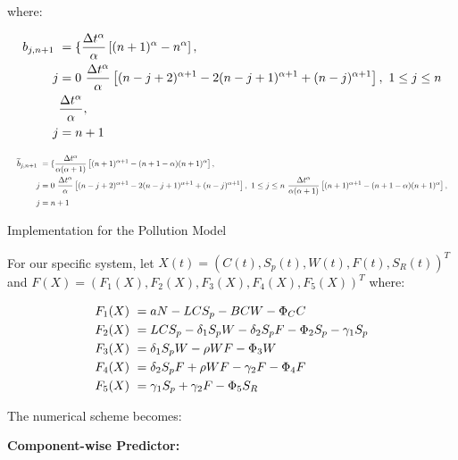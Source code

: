 \documentclass[10pt]{NSP1}
\newcommand{\fitwidth}[1]{\resizebox{\ifdim\width>\linewidth\linewidth\else\width\fi}{!}{#1}}
\begin{document}
where:

\[
\fitwidth{$\displaystyle \begin{aligned}
b_{j,n + 1}\ &= \{\frac{\Delta t^{\alpha}}{\alpha}\left\lbrack (n + 1)^{\alpha} - n^{\alpha} \right\rbrack, \\
j &= 0\ \frac{\Delta t^{\alpha}}{\alpha}\left\lbrack (n - j + 2)^{\alpha + 1} - 2(n - j + 1)^{\alpha + 1} + (n - j)^{\alpha + 1} \right\rbrack,\ 1 \leq j \leq n \\
&\frac{\Delta t^{\alpha}}{\alpha}, \\
j &= n + 1\ \
\end{aligned}$}
\]

\[
\fitwidth{$\displaystyle \begin{aligned}
{\widetilde{b}}_{j,n + 1}\ &= \{\frac{\Delta t^{\alpha}}{\alpha(\alpha + 1)}\left\lbrack (n + 1)^{\alpha + 1} - (n + 1 - \alpha)(n + 1)^{\alpha} \right\rbrack, \\
j &= 0\ \frac{\Delta t^{\alpha}}{\alpha}\left\lbrack (n - j + 2)^{\alpha + 1} - 2(n - j + 1)^{\alpha + 1} + (n - j)^{\alpha + 1} \right\rbrack,\ 1 \leq j \leq n\ \frac{\Delta t^{\alpha}}{\alpha(\alpha + 1)}\left\lbrack (n + 1)^{\alpha + 1} - (n + 1 - \alpha)(n + 1)^{\alpha} \right\rbrack, \\
j &= n + 1\ \
\end{aligned}$}
\]

Implementation for the Pollution Model

For our specific system, let \(X(t) = \left( C(t),S_{p}(t),W(t),F(t),S_{R}(t) \right)^{T}\) and \(F(X) = \left( F_{1}(X),F_{2}(X),F_{3}(X),F_{4}(X),F_{5}(X) \right)^{T}\) where:

\[
\fitwidth{$\displaystyle \begin{aligned}
F_{1}(X)\ &= aN - LCS_{p} - BCW - \Phi_{C}C \\
F_{2}(X)\ &= LCS_{p} - \delta_{1}S_{p}W - \delta_{2}S_{p}F - \Phi_{2}S_{p} - \gamma_{1}S_{p} \\
F_{3}(X)\ &= \delta_{1}S_{p}W - \rho WF - \Phi_{3}W \\
F_{4}(X)\ &= \delta_{2}S_{p}F + \rho WF - \gamma_{2}F - \Phi_{4}F \\
F_{5}(X)\ &= \gamma_{1}S_{p} + \gamma_{2}F - \Phi_{5}S_{R}\
\end{aligned}$}
\]

The numerical scheme becomes:

\textbf{Component-wise Predictor:}
\end{document}
